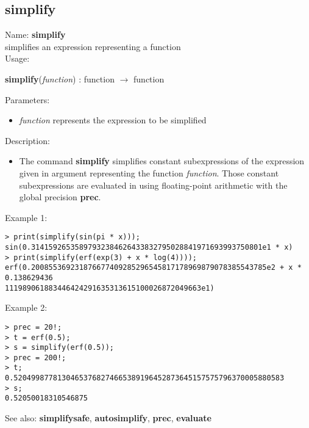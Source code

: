 \subsection{ simplify }
\noindent Name: \textbf{simplify}\\
simplifies an expression representing a function\\

\noindent Usage: 
\begin{center}
\textbf{simplify}(\emph{function}) : \textsf{function} $\rightarrow$ \textsf{function}\\
\end{center}
Parameters: 
\begin{itemize}
\item \emph{function} represents the expression to be simplified
\end{itemize}
\noindent Description: \begin{itemize}

\item The command \textbf{simplify} simplifies constant subexpressions of the
   expression given in argument representing the function
   \emph{function}. Those constant subexpressions are evaluated in using
   floating-point arithmetic with the global precision \textbf{prec}.
\end{itemize}
\noindent Example 1: 
\begin{center}\begin{minipage}{15cm}\begin{Verbatim}[frame=single]
> print(simplify(sin(pi * x)));
sin(0.31415926535897932384626433832795028841971693993750801e1 * x)
> print(simplify(erf(exp(3) + x * log(4))));
erf(0.200855369231876677409285296545817178969879078385543785e2 + x * 0.138629436
111989061883446424291635313615100026872049663e1)
\end{Verbatim}
\end{minipage}\end{center}
\noindent Example 2: 
\begin{center}\begin{minipage}{15cm}\begin{Verbatim}[frame=single]
> prec = 20!;
> t = erf(0.5);
> s = simplify(erf(0.5));
> prec = 200!;
> t;
0.52049987781304653768274665389196452873645157575796370005880583
> s;
0.52050018310546875
\end{Verbatim}
\end{minipage}\end{center}
See also: \textbf{simplifysafe}, \textbf{autosimplify}, \textbf{prec}, \textbf{evaluate}
